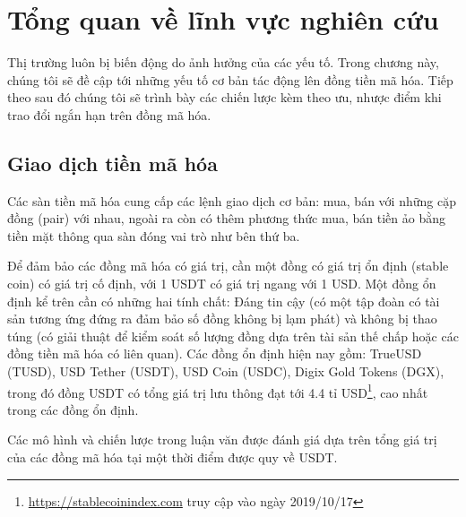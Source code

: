 \chapter{Tổng quan về lĩnh vực nghiên cứu} \label{chap-Overview}
Thị trường luôn bị biến động do ảnh hưởng của các yếu tố. Trong chương này, chúng tôi sẽ đề cập tới những yếu tố cơ bản tác động lên đồng tiền mã hóa. Tiếp theo sau đó chúng tôi sẽ trình bày các chiến lược kèm theo ưu, nhược điểm khi trao đổi ngắn hạn trên đồng mã hóa.


\section{Giao dịch tiền mã hóa}
Các sàn tiền mã hóa cung cấp các lệnh giao dịch cơ bản: mua, bán với những cặp đồng (pair) với nhau, ngoài ra còn có thêm phương thức mua, bán tiền ảo bằng tiền mặt thông qua sàn đóng vai trò như bên thứ ba.\par
Để đảm bảo các đồng mã hóa có giá trị, cần một đồng có giá trị ổn định (stable coin) có giá trị cố định, với 1 USDT có giá trị ngang với 1 USD. Một đồng ổn định kể trên cần có những hai tính chất: Đáng tin cậy (có một tập đoàn có tài sản tương ứng đứng ra đảm bảo số đồng không bị lạm phát) và không bị thao túng (có giải thuật để kiểm soát số lượng đồng dựa trên tài sản thế chấp hoặc các đồng tiền mã hóa có liên quan). Các đồng ổn định hiện nay gồm:
 TrueUSD (TUSD), USD Tether (USDT), USD Coin (USDC), Digix Gold Tokens (DGX), trong đó đồng USDT có tổng giá trị lưu thông đạt tới 4.4 tỉ USD\footnote{\url{https://stablecoinindex.com} truy cập vào ngày 2019/10/17}, cao nhất trong các đồng ổn định.
 
 Các mô hình và chiến lược trong luận văn được đánh giá dựa trên tổng giá trị của các đồng mã hóa tại một thời điểm được quy về USDT.


